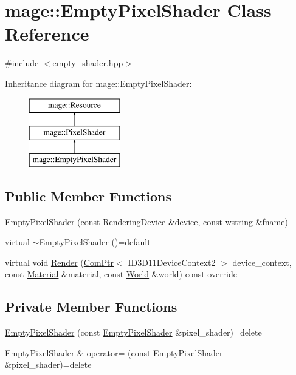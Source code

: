 \hypertarget{classmage_1_1_empty_pixel_shader}{}\section{mage\+:\+:Empty\+Pixel\+Shader Class Reference}
\label{classmage_1_1_empty_pixel_shader}


{\ttfamily \#include $<$empty\+\_\+shader.\+hpp$>$}

Inheritance diagram for mage\+:\+:Empty\+Pixel\+Shader\+:\begin{figure}[H]
\begin{center}
\leavevmode
\includegraphics[height=3.000000cm]{classmage_1_1_empty_pixel_shader}
\end{center}
\end{figure}
\subsection*{Public Member Functions}
\begin{DoxyCompactItemize}
\item 
\hyperlink{classmage_1_1_empty_pixel_shader_a1003302597502cd86cf7aa4f110c19f4}{Empty\+Pixel\+Shader} (const \hyperlink{classmage_1_1_rendering_device}{Rendering\+Device} \&device, const wstring \&fname)
\item 
virtual \hyperlink{classmage_1_1_empty_pixel_shader_ace5053e12d6fa60caa2bcca00d192fab}{$\sim$\+Empty\+Pixel\+Shader} ()=default
\item 
virtual void \hyperlink{classmage_1_1_empty_pixel_shader_a492a634cc8ef167f92c63f8d863e8e6b}{Render} (\hyperlink{namespacemage_ae74f374780900893caa5555d1031fd79}{Com\+Ptr}$<$ I\+D3\+D11\+Device\+Context2 $>$ device\+\_\+context, const \hyperlink{structmage_1_1_material}{Material} \&material, const \hyperlink{classmage_1_1_world}{World} \&world) const override
\end{DoxyCompactItemize}
\subsection*{Private Member Functions}
\begin{DoxyCompactItemize}
\item 
\hyperlink{classmage_1_1_empty_pixel_shader_a5eaa8370d531fcc7877cc706bc8fbcce}{Empty\+Pixel\+Shader} (const \hyperlink{classmage_1_1_empty_pixel_shader}{Empty\+Pixel\+Shader} \&pixel\+\_\+shader)=delete
\item 
\hyperlink{classmage_1_1_empty_pixel_shader}{Empty\+Pixel\+Shader} \& \hyperlink{classmage_1_1_empty_pixel_shader_a7702fdae1d752ed422d1508e6ee08479}{operator=} (const \hyperlink{classmage_1_1_empty_pixel_shader}{Empty\+Pixel\+Shader} \&pixel\+\_\+shader)=delete
\end{DoxyCompactItemize}
